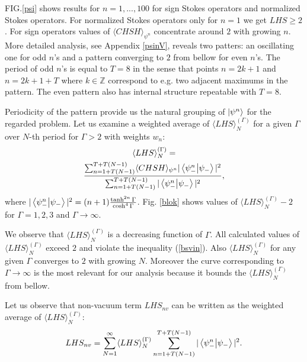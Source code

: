 \documentclass[aps,pra, twocolumn, showpacs]{revtex4-2}
\begin{document}
FIG.\ref{psi} shows results for $n=1,...,100$  for sign Stokes operators and normalized Stokes operators. For normalized Stokes operators only for $n=1$  we get $LHS \geq 2$. For sign operators values of $\langle CHSH\rangle_{\psi^n}$ concentrate around $2$ with growing $n$. More detailed analysis, see Appendix \ref{psinV}, reveals two patters: an oscillating one for odd $n$'s and a pattern converging to $2$ from bellow for even $n$'s. 
The period of odd $n$'s is equal to $T=8$ in the sense that  points  $n=2k+1$ and  $n=2k+1+T$ where $k \in \mathbb{Z}$  correspond to e.g. two adjacent maximums in the pattern.
The even pattern also has internal structure repeatable with $T=8$. 

Periodicity of the pattern provide us the natural grouping of $\ket{\psi^n}$ for the regarded problem. Let us examine a weighted average of 
$\langle LHS \rangle_N^{(\Gamma)}$ for a given $\Gamma$ over $N$-th period for $\Gamma>2$ with weights $w_n$:
\begin{multline}
\langle LHS \rangle_N^{(\Gamma)}=\\
\frac{\sum_{n=1+T (N-1)}^{T+T (N-1)}\langle CHSH\rangle_{\psi^n}|\braket{\psi_-^n}{\psi_-}|^2}{\sum_{n=1+T (N-1)}^{T+T (N-1)}|\braket{\psi_-^n}{\psi_-}|^2},
\end{multline}
where $|\braket{\psi_-^n}{\psi_-}|^2=(n+1)\frac{\tanh^{2n}{\Gamma}}{\cosh^4{\Gamma}}$. Fig. \ref{blok} shows values of $\langle LHS \rangle_N^{(\Gamma)}-2$ for $\Gamma=1,2,3$ and $\Gamma\rightarrow\infty$. 

We observe that $\langle LHS \rangle_N^{(\Gamma)}$ is a decreasing function of $\Gamma$. All calculated values of $\langle LHS \rangle_N^{(\Gamma)}$ exceed $2$ and violate the inequality (\ref{bsvin}). 
Also $\langle LHS \rangle_N^{(\Gamma)}$ for any given $\Gamma$ converges to $2$ with growing $N$.  Moreover the curve corresponding to $\Gamma\rightarrow\infty$ is the most relevant for our analysis  because it  bounds the  $\langle LHS \rangle_N^{(\Gamma)}$ from bellow. 

Let us observe that non-vacuum term $LHS_{n{v}}$ can be written as the weighted average of $\langle LHS \rangle_N^{(\Gamma)}$:
\begin{multline}
LHS_{nv}=
\sum_{N=1}^\infty \langle LHS \rangle_N^{(\Gamma)} \sum_{n=1+T (N-1)}^{T+T (N-1)}|\braket{\psi_-^n}{\psi_-}|^2.
\end{multline}
\end{document}
